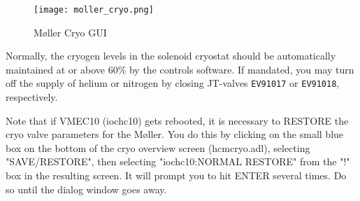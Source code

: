 {\begin{figure}[htb]
\begin{center}
\texttt{[image: moller\_cryo.png]}
\caption{M\o ller Cryo GUI\label{molcryomedm}}
\end{center}
\end{figure}
%

Normally, the cryogen levels in the solenoid cryostat should be
automatically maintained at or above 60\% by the controls software.
If mandated, you may turn off the supply of helium or nitrogen by
closing JT-valves {\tt EV91017} or {\tt EV91018}, respectively.

Note that if VMEC10 (iochc10) gets rebooted, it is necessary to
RESTORE the cryo valve parameters for the M\o ller. You do this by
clicking on the small blue box on the bottom of the cryo overview
screen (hcmcryo.adl), selecting "SAVE/RESTORE", then selecting
"iochc10:NORMAL RESTORE" from the "!" box in the resulting screen. It
will prompt you to hit ENTER several times. Do so until the dialog
window goes away.

}
